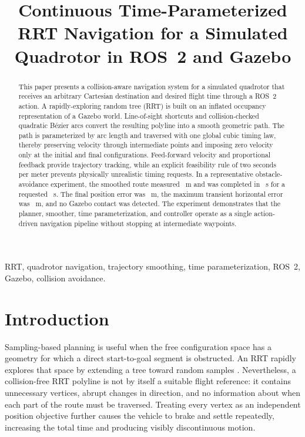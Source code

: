 \documentclass[conference]{IEEEtran}
\title{Continuous Time-Parameterized RRT Navigation for a Simulated Quadrotor in ROS~2 and Gazebo}
\author{\IEEEauthorblockN{Sarah Daniela Vásquez Melgarejo}
\IEEEauthorblockA{Robotics Practice 4\\
ROS~2 Humble and Gazebo Classic}}
\begin{document}
\maketitle

\begin{abstract}
This paper presents a collision-aware navigation system for a simulated
quadrotor that receives an arbitrary Cartesian destination and desired flight
time through a ROS~2 action. A rapidly-exploring random tree (RRT) is built on
an inflated occupancy representation of a Gazebo world. Line-of-sight
shortcuts and collision-checked quadratic B\'ezier arcs convert the resulting
polyline into a smooth geometric path. The path is parameterized by arc length
and traversed with one global cubic timing law, thereby preserving velocity
through intermediate points and imposing zero velocity only at the initial and
final configurations. Feed-forward velocity and proportional feedback provide
trajectory tracking, while an explicit feasibility rule of two seconds per
meter prevents physically unrealistic timing requests. In a representative
obstacle-avoidance experiment, the smoothed route measured \SmoothLength~m and
was completed in \WallTime~s for a requested \RequestedTime~s. The final
position error was \FinalError~m, the maximum transient horizontal error was
\MaxXY~m, and no Gazebo contact was detected. The experiment demonstrates that
the planner, smoother, time parameterization, and controller operate as a
single action-driven navigation pipeline without stopping at intermediate
waypoints.
\end{abstract}

\begin{IEEEkeywords}
RRT, quadrotor navigation, trajectory smoothing, time parameterization,
ROS~2, Gazebo, collision avoidance.
\end{IEEEkeywords}

\section{Introduction}

Sampling-based planning is useful when the free configuration space has a
geometry for which a direct start-to-goal segment is obstructed. An RRT rapidly
explores that space by extending a tree toward random samples
\cite{lavalle1998,lavalle2006}.
Nevertheless, a collision-free RRT polyline is not by itself a suitable flight
reference: it contains unnecessary vertices, abrupt changes in direction, and
no information about when each part of the route must be traversed. Treating
every vertex as an independent position objective further causes the vehicle to
brake and settle repeatedly, increasing the total time and producing visibly
discontinuous motion.
\end{document}
